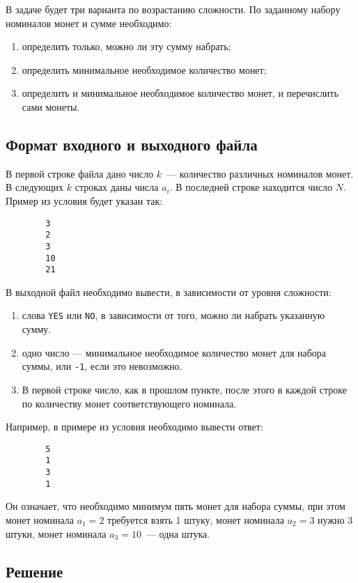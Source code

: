 \documentclass{article}
\begin{document}
    В задаче будет три варианта по возрастанию сложности. По заданному набору номиналов монет и сумме необходимо:
    \begin{enumerate}
        \item определить только, можно ли эту сумму набрать;
        \item определить минимальное необходимое количество монет;
        \item определить и минимальное необходимое количество монет, и перечислить сами монеты.
    \end{enumerate}
    \subsection{Формат входного и выходного файла}
    В первой строке файла дано число $k$~--- количество различных номиналов монет.
    В следующих $k$ строках даны числа $a_i$. В последней строке находится число $N$.
    Пример из условия будет указан так:
    \begin{verbatim}
        3
        2
        3
        10
        21
    \end{verbatim}
    В выходной файл необходимо вывести, в зависимости от уровня сложности:
    \begin{enumerate}
        \item слова \verb|YES| или \verb|NO|, в зависимости от того, можно ли набрать указанную сумму.
        \item одно число — минимальное необходимое количество монет для набора суммы, или \verb|-1|, если это невозможно.
        \item В первой строке число, как в прошлом пункте, после этого в каждой строке по количеству монет соответствующего номинала.
    \end{enumerate}

    Например, в примере из условия необходимо вывести ответ:
    \begin{verbatim}
        5
        1
        3
        1
    \end{verbatim}
    Он означает, что необходимо минимум пять монет для набора суммы, при этом монет номинала $a_1=2$ требуется взять 1 штуку, монет номинала $a_2=3$ нужно 3 штуки, монет номинала $a_3=10$~--- одна штука.

    \subsection{Решение}
\end{document}
